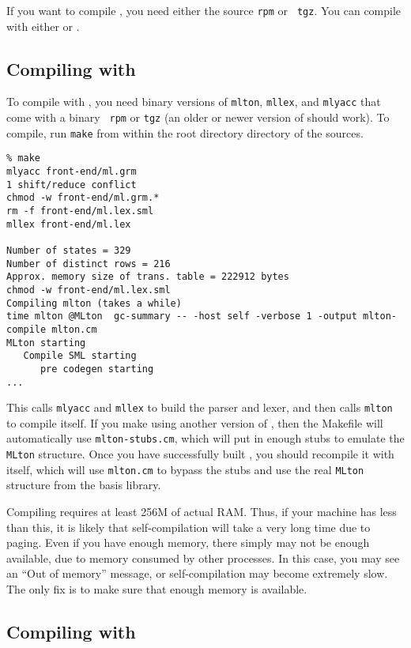 
If you want to compile {\mlton}, you need either the source {\tt rpm} or {\tt
tgz}.  You can compile with either {\mlton} or {\smlnj}.

\subsection{Compiling with {\mlton}}

To compile with {\mlton}, you need binary versions of {\tt mlton},
{\tt mllex}, and {\tt mlyacc} that come with a {\mlton} binary {\tt
rpm} or {\tt tgz} (an older or newer version of {\mlton} should work).
To compile, run {\tt make} from within the root directory directory of the
sources.
\begin{verbatim}
% make
mlyacc front-end/ml.grm
1 shift/reduce conflict
chmod -w front-end/ml.grm.*
rm -f front-end/ml.lex.sml
mllex front-end/ml.lex

Number of states = 329
Number of distinct rows = 216
Approx. memory size of trans. table = 222912 bytes
chmod -w front-end/ml.lex.sml
Compiling mlton (takes a while)
time mlton @MLton  gc-summary -- -host self -verbose 1 -output mlton-compile mlton.cm
MLton starting
   Compile SML starting
      pre codegen starting
...
\end{verbatim}
This calls {\tt mlyacc} and {\tt mllex} to build the parser and lexer, and then
calls {\tt mlton} to compile itself.  If you make {\mlton} using another version
of {\mlton}, then the Makefile will automatically use {\tt mlton-stubs.cm},
which will put in enough stubs to emulate the {\tt MLton} structure.  Once you
have successfully built {\mlton}, you should recompile it with itself, which
will use {\tt mlton.cm} to bypass the stubs and use the real {\tt MLton}
structure from the basis library.

Compiling {\mlton} requires at least 256M of actual RAM.  Thus, if your machine
has less than this, it is likely that self-compilation will take a very long
time due to paging.  Even if you have enough memory, there simply may not be
enough available, due to memory consumed by other processes.  In this case, you
may see an ``Out of memory'' message, or self-compilation may become extremely
slow.  The only fix is to make sure that enough memory is available.

\subsection{Compiling with {\smlnj}}

